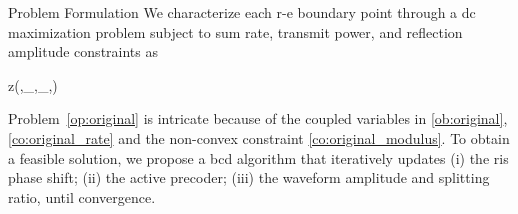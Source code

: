 \begin{section}{Problem Formulation}\label{sc:problem_formulation}
	We characterize each \gls{r-e} boundary point through a \gls{dc} maximization problem subject to sum rate, transmit power, and reflection amplitude constraints as
	\begin{maxi!}
		{}{z(\boldsymbol{\theta},_{},_{},\rho)}{\label{op:original}}{\label{ob:original}}
		\label{co:original_rate}
		\label{co:original_power}
		\label{co:original_modulus}
	\end{maxi!}
	Problem~\eqref{op:original} is intricate because of the coupled variables in \eqref{ob:original}, \eqref{co:original_rate} and the non-convex constraint \eqref{co:original_modulus}. To obtain a feasible solution, we propose a \gls{bcd} algorithm that iteratively updates (i) the \gls{ris} phase shift; (ii) the active precoder; (iii) the waveform amplitude and splitting ratio, until convergence.



\end{section}
